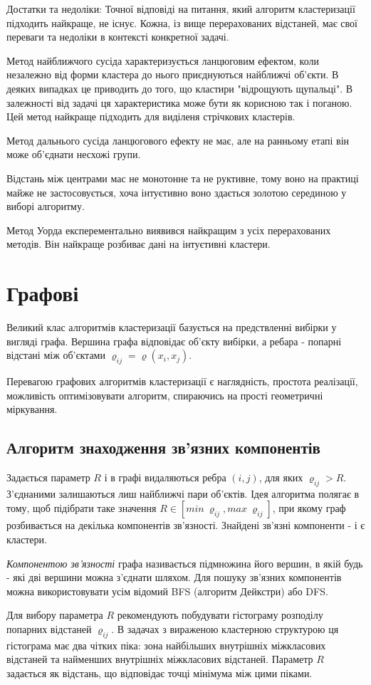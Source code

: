 \documentclass[a4paper,14pt,russian]{extreport}
\begin{document}
\par Достатки та недоліки: 
	Точної відповіді на питання, який алгоритм кластеризації підходить найкраще, не існує. Кожна, із вище перерахованих відстаней, має свої переваги та недоліки в контексті конкретної задачі. \cite{voron}\par 
	Метод найближчого сусіда характеризується ланцюговим ефектом, коли незалежно від форми кластера до нього приєднуються найближчі об'єкти. В деяких випадках це приводить до того, що кластири "відрощують щупальці". В залежності від задачі ця характеристика може бути як корисною так і поганою. Цей метод найкраще підходить для виділеня стрічкових кластерів.
	\par 
	Метод дальнього сусіда ланцюгового ефекту не має, але на ранньому етапі він може об'єднати несхожі групи. \par 
	Відстань між центрами мас не монотонне та не руктивне, тому воно на практиці майже не застосовується, хоча інтуєтивно воно здається золотою серединою у виборі алгоритму. \par 
	Метод Уорда експерементально виявився найкращим з усіх перерахованих методів. Він найкраще розбиває дані на інтуєтивні кластери.\cite{wiliams}
	\section{Графові}
	Великий клас алгоритмів кластеризації базується на предствленні вибірки у вигляді графа. Вершина графа відповідає об'єкту вибірки, а ребара - попарні відстані між об'єктами $ \varrho_{ij} = \varrho(x_i, x_j)$. \par 
	Перевагою графових алгоритмів кластеризації є наглядність, простота реалізації, можливість оптимізовувати алгоритм, спираючись на прості геометричні міркування. 
	
		\subsection{Алгоритм знаходження зв'язних компонентів}
		Задається параметр $R$ і в графі видаляються ребра $(i,j)$, для яких $\varrho_{ij} > R$. З'єднаними залишаються лиш найближчі пари об'єктів. Ідея алгоритма полягає в тому, щоб підібрати таке значення $R \in [min \ \varrho_{ij}, max \ \varrho_{ij}]$, при якому граф розбивається на декілька компонентів зв'язності. Знайдені зв'язні компоненти - і є кластери. \cite{mandel}\par 
		\textit{Компонентою зв'язності} графа називається підмножина його вершин, в якій будь - які дві вершини можна з'єднати шляхом. Для пошуку зв'язних компонентів можна використовувати усім відомий BFS (алгоритм Дейкстри) або DFS. \par
		Для вибору параметра $R$ рекомендують побудувати гістограму розподілу попарних відстаней $\varrho_{ij}$. В задачах з вираженою кластерною структурою ця гістограма має два чітких піка: зона найбільших внутрішніх міжкласових відстаней та найменших внутрішніх міжкласових відстаней. Параметр $R$ задається як відстань, що відповідає точці мінімума між цими піками.
	
\end{document}
